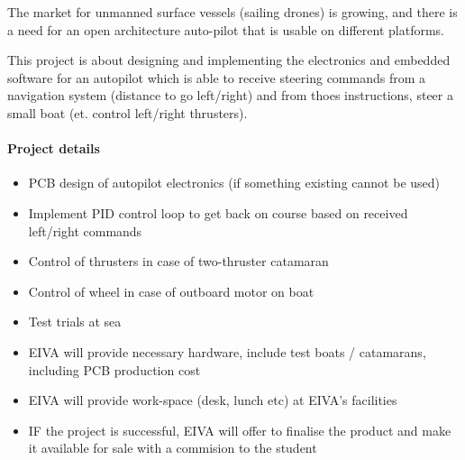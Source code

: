 The market for unmanned surface vessels (sailing drones) is growing, and there is a need for an open architecture auto-pilot that is usable on different platforms.

This project is about designing and implementing the electronics and embedded software for an autopilot which is able to receive steering commands from a navigation system (distance to go left/right) and from thoes instructions, steer a small boat (et. control left/right thrusters).

\paragraph{Project details}
\begin{itemize}
\item PCB design of autopilot electronics (if something existing cannot be used)
\item Implement PID control loop to get back on course based on received left/right commands
\item Control of thrusters in case of two-thruster catamaran
\item Control of wheel in case of outboard motor on boat
\item Test trials at sea
\item EIVA will provide necessary hardware, include test boats / catamarans, including PCB production cost
\item EIVA will provide work-space (desk, lunch etc) at EIVA's facilities
\item IF the project is successful, EIVA will offer to finalise the product and make it available for sale with a commision to the student
\end{itemize}